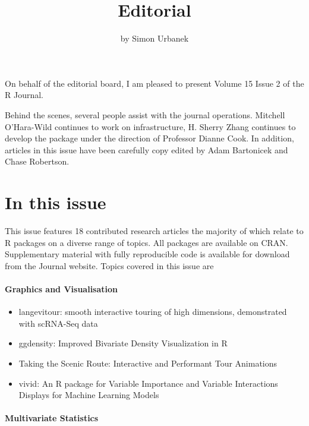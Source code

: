 \title{Editorial}


\author{by Simon Urbanek}

\maketitle


On behalf of the editorial board, I am pleased to present Volume 15 Issue 2 of the R Journal.

Behind the scenes, several people assist with the journal operations. Mitchell O'Hara-Wild continues to work on infrastructure, H. Sherry Zhang continues to develop the  package under the direction of Professor Dianne Cook. In addition, articles in this issue have been carefully copy edited by Adam Bartonicek and Chase Robertson.

\hypertarget{in-this-issue}{%
\section*{In this issue}\label{in-this-issue}}

This issue features 18 contributed research articles the
majority of which relate to R packages on a diverse range of
topics. All packages are available on CRAN. Supplementary material
with fully reproducible code is available for download from the
Journal website. Topics covered in this issue are

\hypertarget{graphics-and-visualisation}{%
\paragraph{Graphics and Visualisation}\label{graphics-and-visualisation}}

\begin{itemize}
\tightlist
\item
  langevitour: smooth interactive touring of high dimensions, demonstrated with scRNA-Seq data
\item
  ggdensity: Improved Bivariate Density Visualization in R
\item
  Taking the Scenic Route: Interactive and Performant Tour Animations
\item
  vivid: An R package for Variable Importance and Variable Interactions Displays for Machine Learning Models
\end{itemize}

\hypertarget{multivariate-statistics}{%
\paragraph{Multivariate Statistics}\label{multivariate-statistics}}

